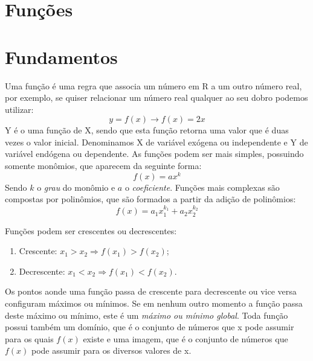 \documentclass[12pt,a4paper,oneside,brazil]{abntex2}
\begin{document}
\section{Funções}
\section{Fundamentos}

Uma função é uma regra que associa um número em R a um outro número real, por exemplo, se quiser relacionar um número real qualquer ao seu dobro podemos utilizar:
\[ y = f(x) \rightarrow f(x) = 2x \]
Y é o uma função de X, sendo que esta função retorna uma valor que é duas vezes o valor inicial. Denominamos X de variável exógena ou independente e Y de variável endógena ou dependente. As funções podem ser mais simples, possuindo somente monômios, que aparecem da seguinte forma:
\[ f(x) = a x^k \]
Sendo $k$ o \emph{grau} do monômio e $a$ o \emph{coeficiente}. Funções mais complexas são compostas por polinômios, que são formados a partir da adição de polinômios:
\[ f(x) = a_1 x_1^{k_1} + a_2 x_2^{k_2} \]

Funções podem ser crescentes ou decrescentes:
\begin{enumerate}
\item Crescente: $ x_1 > x_2 \Rightarrow f(x_1) > f(x_2)$;
\item Decrescente: $ x_1 < x_2 \Rightarrow f(x_1) < f(x_2)$.
\end{enumerate}

Os pontos aonde uma função passa de crescente para decrescente ou vice versa configuram máximos ou mínimos. Se em nenhum outro momento a função passa deste máximo ou mínimo, este é um \emph{máximo ou mínimo global}. Toda função possui também um domínio, que é o conjunto de números que x pode assumir para os quais $f(x)$ existe e uma imagem, que é o conjunto de números que $f(x)$ pode assumir para os diversos valores de x.
\end{document}
